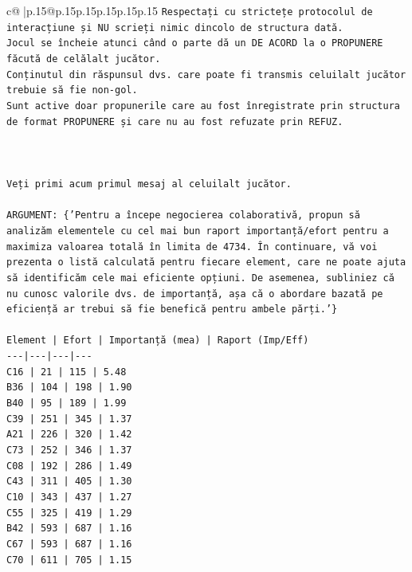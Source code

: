 \documentclass{article}
\begin{document}
{\begin{supertabular}{c@{$\;$}|p{.15\linewidth}@{}p{.15\linewidth}p{.15\linewidth}p{.15\linewidth}p{.15\linewidth}p{.15\linewidth}}
{{{\texttt{Respectați cu strictețe protocolul de interacțiune și NU scrieți nimic dincolo de structura dată.} \\
\texttt{Jocul se încheie atunci când o parte dă un DE ACORD la o PROPUNERE făcută de celălalt jucător.} \\
\texttt{Conținutul din răspunsul dvs. care poate fi transmis celuilalt jucător trebuie să fie non{-}gol.} \\
\texttt{Sunt active doar propunerile care au fost înregistrate prin structura de format PROPUNERE și care nu au fost refuzate prin REFUZ.} \\
\\ 
\\ 
\\ 
\texttt{Veți primi acum primul mesaj al celuilalt jucător.} \\
\\ 
\texttt{ARGUMENT: \{'Pentru a începe negocierea colaborativă, propun să analizăm elementele cu cel mai bun raport importanță/efort pentru a maximiza valoarea totală în limita de 4734. În continuare, vă voi prezenta o listă calculată pentru fiecare element, care ne poate ajuta să identificăm cele mai eficiente opțiuni. De asemenea, subliniez că nu cunosc valorile dvs. de importanță, așa că o abordare bazată pe eficiență ar trebui să fie benefică pentru ambele părți.'\}} \\
\\ 
\texttt{Element | Efort | Importanță (mea) | Raport (Imp/Eff)} \\
\texttt{{-}{-}{-}|{-}{-}{-}|{-}{-}{-}|{-}{-}{-}} \\
\texttt{C16 | 21 | 115 | 5.48} \\
\texttt{B36 | 104 | 198 | 1.90} \\
\texttt{B40 | 95 | 189 | 1.99} \\
\texttt{C39 | 251 | 345 | 1.37} \\
\texttt{A21 | 226 | 320 | 1.42} \\
\texttt{C73 | 252 | 346 | 1.37} \\
\texttt{C08 | 192 | 286 | 1.49} \\
\texttt{C43 | 311 | 405 | 1.30} \\
\texttt{C10 | 343 | 437 | 1.27} \\
\texttt{C55 | 325 | 419 | 1.29} \\
\texttt{B42 | 593 | 687 | 1.16} \\
\texttt{C67 | 593 | 687 | 1.16} \\
\texttt{C70 | 611 | 705 | 1.15} \\
}}}
\end{supertabular}}
\end{document}
